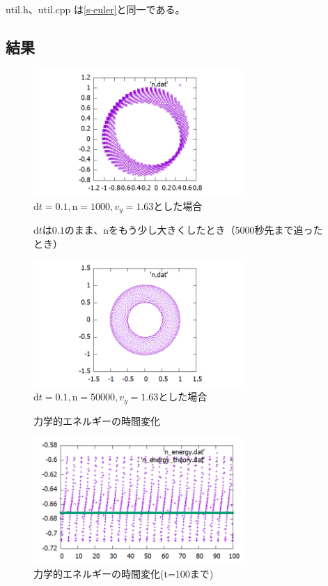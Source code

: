 \documentclass[a4paper,twoside]{jarticle}
\begin{document}
util.h、util.cpp は\ref{s-euler}と同一である。

\subsection{結果}
\begin{figure}[H]
\begin{center}
\includegraphics[width=8cm]{../cpp/out/leap-frog/n.png}
\end{center}
\caption{$\mathrm{d}t=0.1, \mathrm{n}=1000, v_y=1.63$とした場合}
\end{figure}

\begin{figure}[H]
$\mathrm{d}t$は$0.1$のまま、nをもう少し大きくしたとき（5000秒先まで追ったとき）
\begin{center}
\includegraphics[width=8cm]{../cpp/out/leap-frog/n_dt=e-1_n=50000.png}
\end{center}
\caption{$\mathrm{d}t=0.1, \mathrm{n}=50000, v_y=1.63$とした場合}
\end{figure}

\begin{figure}[H]
力学的エネルギーの時間変化
\begin{center}
\includegraphics[width=8cm]{../cpp/out/leap-frog/n_energy_theory.png}
\end{center}
\caption{力学的エネルギーの時間変化(t=100まで)}
\end{figure}
\end{document}
